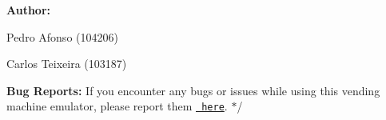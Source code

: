 {\bfseries{Author\+:}}
\begin{DoxyItemize}
\item Pedro Afonso (104206)
\item Carlos Teixeira (103187)
\end{DoxyItemize}

{\bfseries{Bug Reports\+:}} If you encounter any bugs or issues while using this vending machine emulator, please report them \href{https://github.com/pisko19/SETR/issues}{\texttt{ here}}. $\ast$/ 